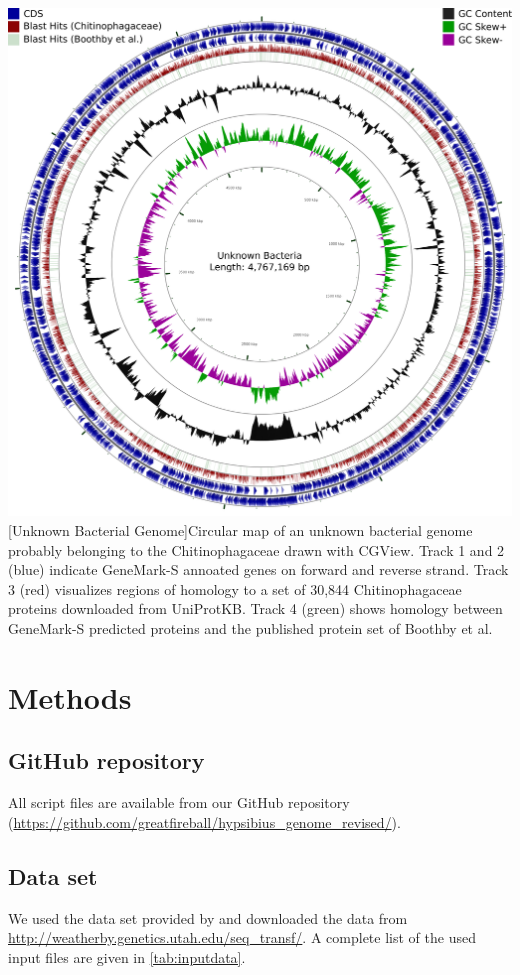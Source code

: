 \documentclass[12pt,a4paper]{scrartcl}
\begin{document}
\includegraphics[width=1\textwidth]{supplementary_figure_3}
[Unknown Bacterial Genome]{Circular map of an unknown bacterial genome probably belonging to the Chitinophagaceae drawn with CGView. Track 1 and 2 (blue) indicate GeneMark-S annoated genes on forward and reverse strand. Track 3 (red) visualizes regions of homology to a set of 30,844 Chitinophagaceae proteins downloaded from UniProtKB. Track 4 (green) shows homology between GeneMark-S predicted proteins and the published protein set of Boothby et al.}

\pagebreak

\section{Methods}

\subsection*{GitHub repository}
All script files are available from our GitHub repository (\url{https://github.com/greatfireball/hypsibius_genome_revised/}).

\subsection*{Data set}
We used the data set provided by \textcite{Boothby2015} and downloaded the data from \url{http://weatherby.genetics.utah.edu/seq_transf/}. A complete list of the used input files are given in \cref{tab:inputdata}.
\end{document}
